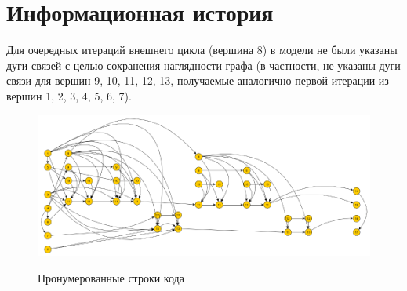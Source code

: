 \documentclass[12pt]{report}
\begin{document}
\section{Информационная история}
Для очередных итераций внешнего цикла (вершина 8) в модели не были указаны дуги связей с целью сохранения наглядности графа (в частности, не указаны дуги связи для вершин 9, 10, 11, 12, 13, получаемые аналогично первой итерации из вершин 1, 2, 3, 4, 5, 6, 7).
\begin{figure}[H]	
	\centering	
	{\includegraphics[scale = 1.15]{ii.png}}
	\caption{Пронумерованные строки кода}
\end{figure}
\end{document}
